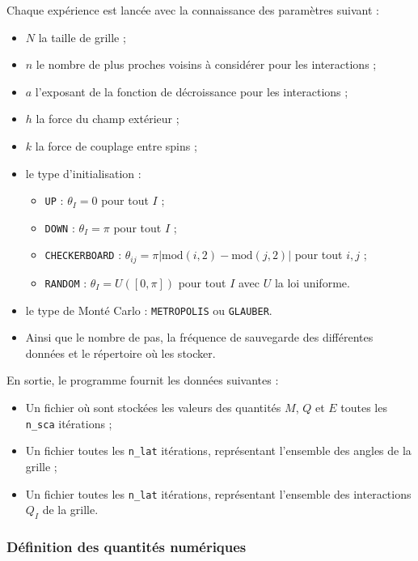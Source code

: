 \documentclass[a4paper, 11pt]{article}
\begin{document}
Chaque expérience est lancée avec la connaissance des paramètres suivant :
\begin{itemize}
    \item $N$ la taille de grille ;
    \item $n$ le nombre de plus proches voisins à considérer pour les interactions ;
    \item $a$ l'exposant de la fonction de décroissance pour les interactions ;
    \item $h$ la force du champ extérieur ;
    \item $k$ la force de couplage entre spins ;
    \item le type d'initialisation :
        \begin{itemize}
            \item \texttt{UP} : $\theta_{I}=0$ pour tout $I$ ;
            \item \texttt{DOWN} : $\theta_{I}=\pi$ pour tout $I$ ;
            \item \texttt{CHECKERBOARD} : $\theta_{ij}=\pi |\mathrm{mod}(i,2)-\mathrm{mod}(j, 2)|$ pour tout $i, j$ ;
            \item \texttt{RANDOM} : $\theta_{I}= U([0, \pi])$ pour tout $I$ avec $U$ la loi
                uniforme. 
        \end{itemize}
    \item le type de Monté Carlo : \texttt{METROPOLIS}  ou \texttt{GLAUBER}.
    \item Ainsi que le nombre de pas, la fréquence de sauvegarde des différentes données et le
        répertoire où les stocker.
\end{itemize}
En sortie, le programme fournit les données suivantes :
\begin{itemize}
    \item Un fichier où sont stockées les valeurs des quantités $M$, $Q$ et $E$ toutes les
        \texttt{n\_sca} itérations ; 
    \item Un fichier toutes les \texttt{n\_lat} itérations, représentant l'ensemble des angles de la
        grille ; 
    \item Un fichier toutes les \texttt{n\_lat} itérations, représentant l'ensemble des interactions
        $Q_I$ de la grille.
\end{itemize}

\subsubsection{Définition des quantités numériques}
\end{document}
